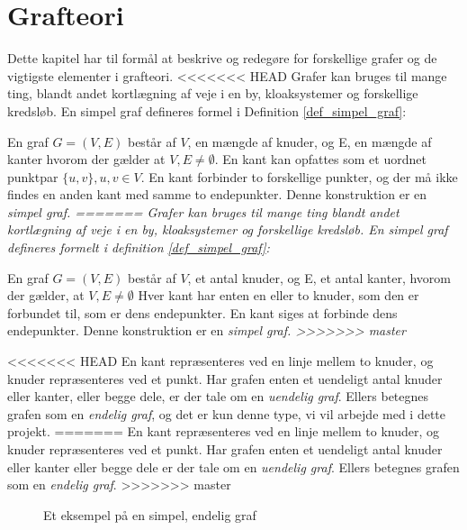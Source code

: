 \chapter{Grafteori}
\usetikzlibrary{arrows, automata}

Dette kapitel har til formål at beskrive og redegøre for forskellige grafer og de vigtigste elementer i grafteori. 
<<<<<<< HEAD
Grafer kan bruges til mange ting, blandt andet kortlægning af veje i en by, kloaksystemer og forskellige kredsløb.
En simpel graf defineres formel i Definition \ref{def_simpel_graf}:


\begin{defn}
En graf $G = (V, E)$ består af $V$, en mængde af knuder, og E, en mængde af kanter hvorom der gælder at $V, E \neq \emptyset$. En kant kan opfattes som et uordnet punktpar 
$\lbrace u,v \rbrace , u,v \in V$.
En kant forbinder to forskellige punkter, og der må ikke findes en anden kant med samme to endepunkter. Denne konstruktion er en \it{simpel graf}.
=======
Grafer kan bruges til mange ting blandt andet kortlægning af veje i en by, kloaksystemer og forskellige kredsløb.
En simpel graf defineres formelt i definition \ref{def_simpel_graf}:


\begin{defn}
En graf $G = (V, E)$ består af $V$, et antal knuder, og E, et antal kanter, hvorom der gælder, at $V, E \neq \emptyset$
Hver kant har enten en eller to knuder, som den er forbundet til, som er dens endepunkter.
En kant siges at forbinde dens endepunkter. Denne konstruktion er en \it{simpel graf}.
>>>>>>> master
\label{def_simpel_graf}
\end{defn}


<<<<<<< HEAD
\noindent En kant repræsenteres ved en linje mellem to knuder, og knuder repræsenteres ved et punkt. Har grafen enten et uendeligt antal knuder eller kanter, eller begge dele, er der tale om en \textit{uendelig graf}. Ellers betegnes grafen som en \textit{endelig graf}, og det er kun denne type, vi vil arbejde med i dette projekt.
=======
\noindent En kant repræsenteres ved en linje mellem to knuder, og knuder repræsenteres ved et punkt. Har grafen enten et uendeligt antal knuder eller kanter eller begge dele er der tale om en \textit{uendelig graf}. Ellers betegnes grafen som en \textit{endelig graf}.
>>>>>>> master


\begin{figure}[h]
\centering
{}
\caption{Et eksempel på en simpel, endelig graf} \label{simpel_graf}
\end{figure}



\end{defn}
